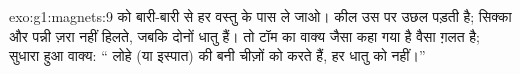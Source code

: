 \begin{solution}{exo:g1:magnets:9}
 को बारी-बारी से हर वस्तु के पास ले जाओ। कील उस पर उछल पड़ती
है; सिक्का और पन्नी ज़रा नहीं हिलते, जबकि दोनों धातु हैं। तो टॉम का
वाक्य जैसा कहा गया है वैसा ग़लत है; सुधारा हुआ वाक्य: `` लोहे
(या इस्पात) की बनी चीज़ों को  करते हैं, हर धातु को नहीं।''
\end{solution}
